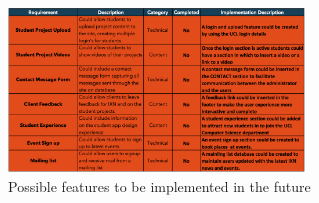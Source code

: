 \documentclass[fontsize=10pt]{extarticle}
\numberwithin{figure}{section} %
\begin{document}
\begin{figure}[H]
      \centering
      \includegraphics[trim = 0 0 0 0, clip, width=0.7\textwidth]{ph6.png}
      \caption{Possible features to be implemented in the future}
 \end{figure}


\newpage
\newpage

% 

\printbibliography
\end{document}
